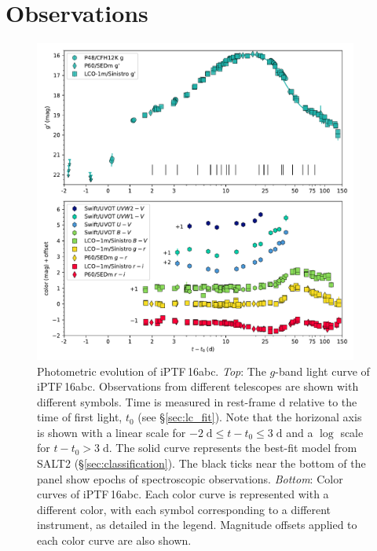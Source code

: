\documentclass[twocolumn]{aastex61}
\newcommand{\abc}{iPTF\,16abc}
\begin{document}
\section{Observations}
\label{sec:obs}

\begin{figure}[htb]
  \centering
  \includegraphics[width=0.95\textwidth]{logLC_with_colors.pdf}
  \caption{Photometric evolution of \abc. \textit{Top}: The $g$-band
  light curve of \abc. Observations from different 
  telescopes are shown with different symbols. Time is measured in 
  rest-frame d relative to the time of first light, $t_0$ (see 
  \S\ref{sec:lc_fit}). Note that the horizonal axis is shown with a linear scale 
  for $-2 \; \mathrm{d} \le t - t_0 \le 3 \; \mathrm{d}$ and a 
  $\log$ scale for $t - t_0 > 3 \; \mathrm{d}$. The solid curve 
  represents the best-fit model from SALT2 
  (\S\ref{sec:classification}). The black ticks near the
  bottom of the panel show epochs of spectroscopic observations.
  \textit{Bottom}: Color curves of \abc. Each color curve is 
  represented with a different color, with each symbol corresponding 
  to a different instrument, as detailed in the legend. Magnitude 
  offsets applied to each color curve are also shown.
  }
  \label{fig:lightcurve}
\end{figure}
\end{document}
